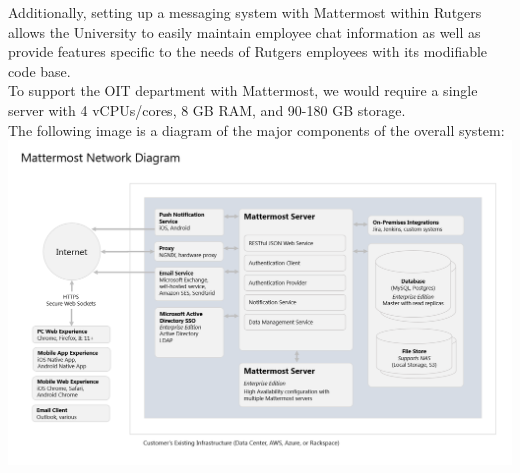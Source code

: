 \documentclass{scrreprt}
\begin{document}
Additionally, setting up a messaging system with Mattermost within Rutgers allows the
University to easily maintain employee chat information as well as provide
features specific to the needs of Rutgers employees with its modifiable code
base.\\

To support the OIT department with Mattermost, we would require a single server
with 4 vCPUs/cores, 8 GB RAM, and 90-180 GB storage.\\

The following image is a diagram of the major components of the overall system:
\includegraphics[scale=0.5, width=\textwidth]{mattermost-diagram.png}
\end{document}
